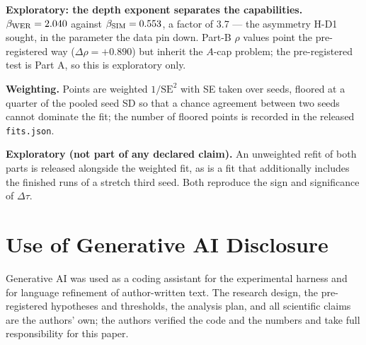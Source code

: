 \documentclass{article}
\begin{document}
\textbf{Exploratory: the depth exponent separates the capabilities.}
$\beta_{\mathrm{WER}} = 2.040$ against $\beta_{\mathrm{SIM}} = 0.553$, a factor
of 3.7 --- the asymmetry H-D1 sought, in the parameter the data pin down. Part-B $\rho$
values point the pre-registered way ($\Delta\rho = +0.890$) but inherit the $A$-cap
problem; the pre-registered test is Part A, so this is exploratory only.

\textbf{Weighting.} Points are weighted $1/\mathrm{SE}^2$ with SE taken over seeds, floored
at a quarter of the pooled seed SD so that a chance agreement between two seeds cannot
dominate the fit; the number of floored points is recorded in the released
\texttt{fits.json}.

\textbf{Exploratory (not part of any declared claim).} An unweighted refit of both parts is
released alongside the weighted fit, as is a fit that additionally includes the finished
runs of a stretch third seed. Both reproduce the sign and significance of $\Delta\tau$.

\section*{Use of Generative AI Disclosure}
Generative AI was used as a coding assistant for the experimental harness and for language
refinement of author-written text. The research design, the pre-registered hypotheses and
thresholds, the analysis plan, and all scientific claims are the authors' own; the authors
verified the code and the numbers and take full responsibility for this paper.
\end{document}
